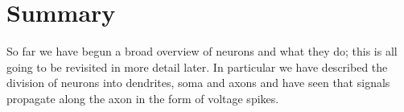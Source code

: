 \documentclass[12pt]{article}
\begin{document}
\section{Summary}

So far we have begun a broad overview of neurons and what they do;
this is all going to be revisited in more detail later. In particular
we have described the division of neurons into dendrites, soma and
axons and have seen that signals propagate along the axon in the form
of voltage spikes.
\end{document}
